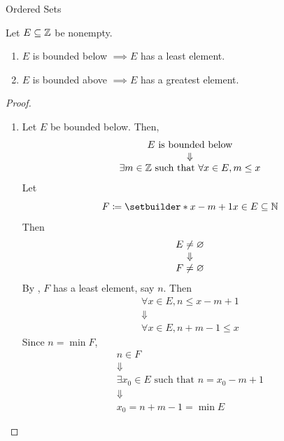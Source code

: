 \begin{section}{Ordered Sets}
\bigskip

\begin{theorem} \label{thm:BoundedSubsetOfZinZHasExtremum}
    Let $E \subseteq \mathbb{Z}$ be nonempty.
    \begin{enumerate}[label=\textbf{(\Alph*)}]
        \item $E$ is bounded below $\implies E$ has a least element.
        \item $E$ is bounded above $\implies E$ has a greatest element.
    \end{enumerate}
\end{theorem}

\begin{proof}
    \begin{enumerate}[label=\textbf{(\Alph*)}]
        \item Let $E$ be bounded below. Then,
        \[
        \begin{array}{c}
            E \text{ is bounded below} \\
            \Downarrow \\
            \exists m \in \mathbb{Z} \text{ such that } \forall x \in E, m \leq x
        \end{array}
        \]
        Let
        \[
        F \coloneqq \setbuilder*{x - m + 1}{x \in E} \subseteq \N
        \]
        Then
        \[
        \begin{array}{c}
            E \neq \varnothing \\
            \Downarrow \\
            F \neq \varnothing
        \end{array}
        \]
        By , $F$ has a least element, say $n$. Then
        \[
        \begin{array}{c}
            \forall x \in E, n \leq x - m + 1 \\
            \Downarrow \\
            \forall x \in E, n + m - 1 \leq x
        \end{array}
        \]
        Since $n = \min F$,
        \[
        \begin{array}{c}
            n \in F \\
            \Downarrow \\
            \exists x_{0} \in E \text{ such that } n = x_{0} - m + 1 \\
            \Downarrow \\
            x_{0} = n + m - 1 = \min E
        \end{array}
\]
\end{enumerate}
\end{proof}
\end{section}
